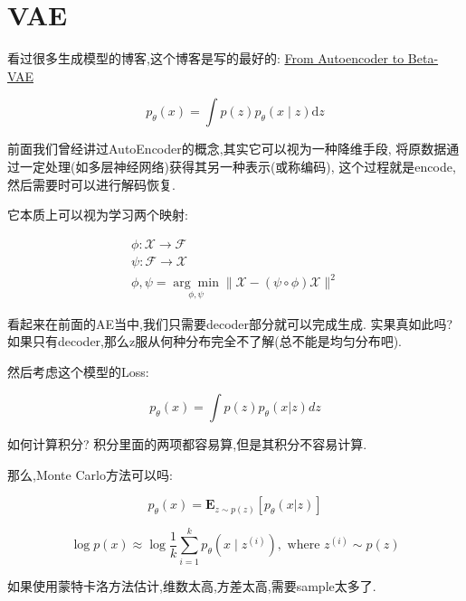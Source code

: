	\section{VAE}

	看过很多生成模型的博客,这个博客是写的最好的:
	\href{https://lilianweng.github.io/posts/2018-08-12-vae/}
	{From Autoencoder to Beta-VAE}
	
	\begin{equation}
		p_{\theta}(x)=\int p(z) p_{\theta}(x \mid z) \mathrm{d}z
	\end{equation} 
	
	前面我们曾经讲过AutoEncoder的概念,其实它可以视为一种降维手段,
	将原数据通过一定处理(如多层神经网络)获得其另一种表示(或称编码),
	这个过程就是encode,然后需要时可以进行解码恢复.
	
	它本质上可以视为学习两个映射:

	\begin{equation}
		\begin{array}{l}
			\phi: \mathcal{X} \rightarrow \mathcal{F} \\
			\psi: \mathcal{F} \rightarrow \mathcal{X} \\
			\phi, \psi=\underset{\phi, \psi}{\arg \min }\|\mathcal{X}-(\psi \circ \phi) \mathcal{X}\|^{2}
		\end{array}
	\end{equation}

	看起来在前面的AE当中,我们只需要decoder部分就可以完成生成.
	实果真如此吗?如果只有decoder,那么z服从何种分布完全不了解(总不能是均匀分布吧).

	然后考虑这个模型的Loss:

	\begin{equation}
		p_\theta(x)=\int p(z)p_\theta(x|z)dz
	\end{equation}

	如何计算积分?
	积分里面的两项都容易算,但是其积分不容易计算.
	
	那么,Monte Carlo方法可以吗:
	
	\begin{equation}
		p_\theta(x)=\mathbf{E}_{z\sim p(z)}[p_\theta(x|z)]
	\end{equation}
		
	\begin{equation}
			\log p(x) \approx \log \frac{1}{k} \sum_{i=1}^{k} p_{\theta}\left(x \mid z^{(i)}\right), \text { where } z^{(i)} \sim p(z)
	\end{equation}
	
	如果使用蒙特卡洛方法估计,维数太高,方差太高,需要sample太多了.

